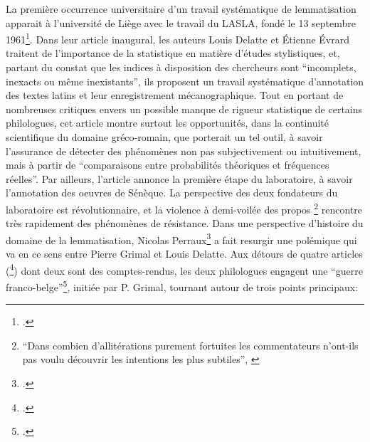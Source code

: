 La première occurrence universitaire d'un travail systématique de lemmatisation apparait à l'université de Liège avec le travail du LASLA, fondé le 13 septembre 1961\footcite{delatte_laboratoire_1961}. Dans leur article inaugural, les auteurs Louis Delatte et Étienne Évrard traitent de l'importance de la statistique en matière d'études stylistiques, et, partant du constat que les indices à disposition des chercheurs sont \enquote{incomplets, inexacts ou même inexistants}, ils proposent un travail systématique d'annotation des textes latins et leur enregistrement mécanographique. Tout en portant de nombreuses critiques envers un possible manque de rigueur statistique de certains philologues, cet article montre surtout les opportunités, dans la continuité scientifique du domaine gréco-romain, que porterait un tel outil, à savoir l'assurance de détecter des phénomènes non pas subjectivement ou intuitivement, mais à partir de \enquote{comparaisons entre probabilités théoriques et fréquences réelles}. Par ailleurs, l'article annonce la première étape du laboratoire, à savoir l'annotation des oeuvres de Sénèque. La perspective des deux fondateurs du laboratoire est révolutionnaire, et la violence à demi-voilée des propos \footnote{\enquote{Dans combien d'allitérations purement fortuites les commentateurs n'ont-ils pas voulu découvrir les intentions les plus subtiles}, \cite[p.~442]{delatte_laboratoire_1961}} rencontre très rapidement des phénomènes de résistance. Dans une perspective d'histoire du domaine de la lemmatisation, Nicolas Perraux\footcite{perreaux_lemmatisation_2019} a fait resurgir une polémique qui va en ce sens entre Pierre Grimal et Louis Delatte. Aux détours de quatre articles (\footcites{grimal_delatte_1964}{delatte_propos_1965}{grimal_index_1966}{delatte_index_1968}) dont deux sont des comptes-rendus, les deux philologues engagent une \enquote{guerre franco-belge}\footcite{verdiere_pierre_1970}, initiée par P. Grimal, tournant autour de trois points principaux:
